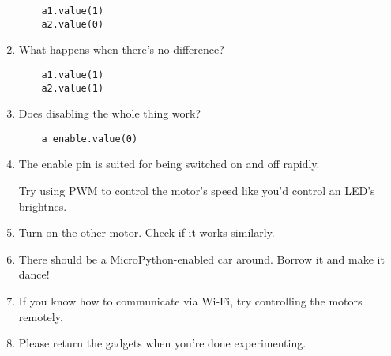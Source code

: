 \documentclass{../tutorial}
\begin{document}
\begin{enumerate}
    \begin{lstlisting}
    a1.value(1)
    a2.value(0)
    \end{lstlisting}

\item
    What happens when there's no difference?

    \begin{lstlisting}
    a1.value(1)
    a2.value(1)
    \end{lstlisting}

\item
    Does disabling the whole thing work?

    \begin{lstlisting}
    a_enable.value(0)
    \end{lstlisting}

\item
    The enable pin is suited for being switched on and off rapidly.

    Try using PWM to control the motor's speed like you'd control an
    LED's brightnes.

\item
    Turn on the other motor. Check if it works similarly.

\item
    There should be a MicroPython-enabled car around.
    Borrow it and make it dance!

\item
    If you know how to communicate via Wi-Fi,
    try controlling the motors remotely.

\item
    Please return the gadgets when you're done experimenting.

\end{enumerate}
\end{document}
